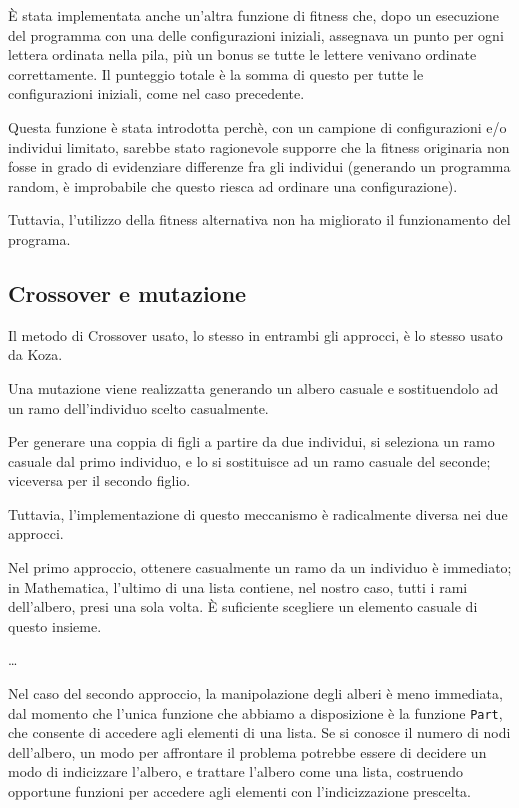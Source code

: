 \documentclass[paper=a4, fontsize=11pt]{scrartcl}
\numberwithin{equation}{section}		%
\numberwithin{figure}{section}			%
\numberwithin{table}{section}				%
\begin{document}
È stata implementata anche un'altra funzione di fitness che, dopo un esecuzione del programma con una delle configurazioni iniziali, assegnava un punto per ogni lettera ordinata nella pila, più un bonus se tutte le lettere venivano ordinate correttamente. Il punteggio totale è la somma di questo per tutte le configurazioni iniziali, come nel caso precedente.
 
Questa funzione è stata introdotta perchè, con un campione di configurazioni e/o individui limitato, sarebbe stato ragionevole supporre che la fitness originaria non fosse in grado di evidenziare differenze fra gli individui (generando un programma random, è improbabile che questo riesca ad ordinare una configurazione).

Tuttavia, l'utilizzo della fitness alternativa non ha migliorato il funzionamento del programa.



\subsection{Crossover e mutazione}

Il metodo di Crossover usato, lo stesso in entrambi gli approcci, è lo stesso usato da Koza.

Una  mutazione  viene realizzatta generando un albero casuale e sostituendolo ad un ramo dell'individuo scelto casualmente.

Per generare una coppia di figli a partire da due individui, si seleziona un ramo casuale dal primo individuo, e lo si sostituisce ad un ramo casuale del seconde; viceversa per il secondo figlio.

Tuttavia, l'implementazione di questo meccanismo è radicalmente diversa nei due approcci.

Nel primo approccio, ottenere  casualmente un ramo da un individuo è immediato; in Mathematica, l'ultimo di una lista contiene, nel nostro caso, tutti i rami dell'albero, presi una sola volta. È suficiente scegliere un elemento casuale di  questo insieme.

\dots

Nel caso del secondo approccio, la manipolazione degli alberi è meno immediata, dal momento che l'unica funzione che abbiamo a disposizione è la funzione \texttt{Part}, che consente di accedere agli elementi di una lista. Se si conosce il numero di nodi dell'albero, un modo per affrontare il problema potrebbe essere di decidere un modo di indicizzare l'albero, e trattare l'albero come una lista, costruendo opportune funzioni per accedere agli elementi con l'indicizzazione prescelta. 
\end{document}
